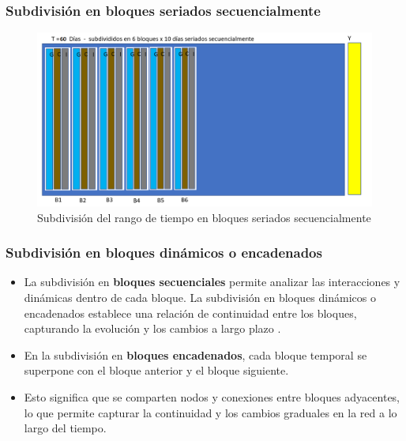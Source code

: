 \documentclass{beamer}
\begin{document}
\begin{frame}
	\frametitle{Subdivisión en bloques seriados secuencialmente}
	\begin{figure}
		\centering
		\includegraphics[width=0.7\linewidth]{figs/imagen20}
		\caption{Subdivisión del rango de tiempo en bloques seriados secuencialmente}
		\label{fig:imagen320}
	\end{figure}
	
\end{frame}


\begin{frame}
	\frametitle{Subdivisión en bloques dinámicos o encadenados}
	\begin{itemize}
		\item La subdivisión en \textbf{bloques secuenciales} permite analizar las interacciones y dinámicas dentro de cada bloque. La subdivisión en bloques dinámicos o encadenados establece una relación de continuidad entre los bloques, capturando la evolución y los cambios a largo plazo \citep{Mahmoud_2021,  tang2010a}.
		\item En la subdivisión en \textbf{bloques encadenados}, cada bloque temporal se superpone con el bloque anterior y el bloque siguiente. 
		\item Esto significa que se comparten nodos y conexiones entre bloques adyacentes, lo que permite capturar la continuidad y los cambios graduales en la red a lo largo del tiempo.
	\end{itemize}	
\end{frame}
\end{document}
